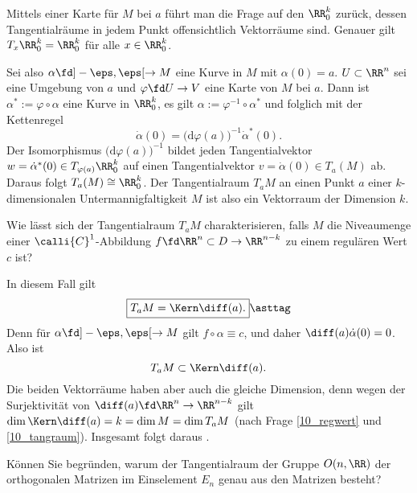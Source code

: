 \begin{antwort}
  Mittels einer Karte für $M$ bei $a$ führt man die Frage auf den 
  $\RR_0^k$ zurück, 
  dessen Tangentialräume in jedem Punkt offensichtlich 
  Vektorräume sind. Genauer gilt $T_x \RR_0^k = \RR_0^k$ für 
  alle $x\in \RR_0^k$. 

  Sei also $\alpha \fd ] -\eps , \eps [ \to M$ eine Kurve in $M$ mit 
  $\alpha(0)=a$. $U\subset \RR^n$ sei eine Umgebung von $a$  
  und $\varphi \fd U \to V$ eine Karte von $M$ bei $a$. Dann ist 
  $\alpha^* := \varphi \circ \alpha $ eine Kurve in $\RR^k_0$, es gilt  
  $\alpha := \varphi^{-1} \circ \alpha^*$ und folglich mit der Kettenregel
  \[
  \dot{\alpha}(0) =\big( \mathrm{d} \varphi (a) \big)^{-1} \dot{\alpha}^* (0).
  \]
  Der Isomorphismus $\big( \mathrm{d} \varphi (a) \big)^{-1} $ bildet 
  jeden Tangentialvektor $w= \dot{\alpha}^* (0) 
  \in T_{\varphi(a)} \RR^k_0$ auf einen 
  Tangentialvektor $v = \dot{\alpha}(0) \in T_a (M)$ ab. Daraus 
  folgt $T_a(M) \cong \RR_0^k$. Der Tangentialraum $T_aM$ an einen Punkt 
  $a$ einer $k$-dimensionalen Untermannigfaltigkeit $M$ ist also  
  ein Vektorraum der Dimension $k$. 
  \AntEnd 
\end{antwort}

\begin{frage}\label{10_tangkern}
  Wie lässt sich der Tangentialraum $T_aM$ charakterisieren, falls 
  $M$ die Niveaumenge einer $\calli{C}^1$-Abbildung 
  $f \fd \RR^n \subset D \to \RR^{n-k}$ 
  zu einem regulären Wert $c$ ist?
\end{frage}

\begin{antwort}
  In diesem Fall gilt 
  \begin{equation}
    \boxed{
      T_a M = \Kern \diff (a).
    } \asttag
  \end{equation}
  Denn für $\alpha \fd ]-\eps,\eps[ \to M$ gilt 
  $f\circ \alpha \equiv c$, und daher 
  $\diff(a) \dot{\alpha}(0) = 0$. Also ist 
  \[
  T_aM \subset \Kern \diff (a).
  \]
  Die beiden Vektorräume haben aber auch die gleiche Dimension, 
  denn wegen der Surjektivität von
  $\diff(a) \fd  \RR^n \to \RR^{n-k}$ gilt 
  $\dim \Kern \diff(a)=k=\dim M = \dim T_a M$ (nach Frage 
  \ref{10_regwert} und \ref{10_tangraum}). Insgesamt 
  folgt daraus {\astref}. \AntEnd
\end{antwort} 

\begin{frage}
  Können Sie begründen, warum der Tangentialraum der Gruppe 
  $O(n,\RR)$ der orthogonalen Matrizen im Einselement $E_n$ genau aus 
  den  Matrizen besteht?
\end{frage}

